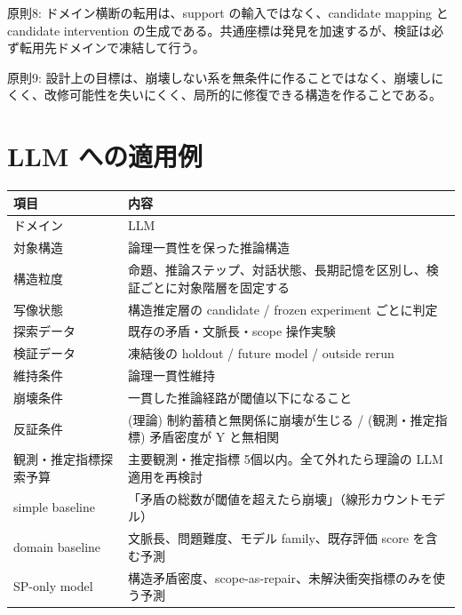 \documentclass[12pt,a4paper]{article}
\begin{document}
原則8: ドメイン横断の転用は、support の輸入ではなく、candidate mapping と candidate intervention の生成である。共通座標は発見を加速するが、検証は必ず転用先ドメインで凍結して行う。

原則9: 設計上の目標は、崩壊しない系を無条件に作ることではなく、崩壊しにくく、改修可能性を失いにくく、局所的に修復できる構造を作ることである。

\section{LLM への適用例}\label{llm-ux3078ux306eux9069ux7528ux4f8b}

{\def\LTcaptype{table} %
\begin{longtable}[]{@{}
  >{\raggedright\arraybackslash}p{}
  >{\raggedright\arraybackslash}p{}@{}}
\toprule\noalign{}
\begin{minipage}[b]{\linewidth}\raggedright
項目
\end{minipage} & \begin{minipage}[b]{\linewidth}\raggedright
内容
\end{minipage} \\
\midrule\noalign{}
\endhead
\bottomrule\noalign{}
\endlastfoot
ドメイン & LLM \\
対象構造 & 論理一貫性を保った推論構造 \\
構造粒度 & 命題、推論ステップ、対話状態、長期記憶を区別し、検証ごとに対象階層を固定する \\
写像状態 & 構造推定層の candidate / frozen experiment ごとに判定 \\
探索データ & 既存の矛盾・文脈長・scope 操作実験 \\
検証データ & 凍結後の holdout / future model / outside rerun \\
維持条件 & 論理一貫性維持 \\
崩壊条件 & 一貫した推論経路が閾値以下になること \\
反証条件 & (理論) 制約蓄積と無関係に崩壊が生じる / (観測・推定指標) 矛盾密度が Y と無相関 \\
観測・推定指標探索予算 & 主要観測・推定指標 5個以内。全て外れたら理論の LLM 適用を再検討 \\
simple baseline & 「矛盾の総数が閾値を超えたら崩壊」（線形カウントモデル） \\
domain baseline & 文脈長、問題難度、モデル family、既存評価 score を含む予測 \\
SP-only model & 構造矛盾密度、scope-as-repair、未解決衝突指標のみを使う予測 \\

\end{longtable}}
\end{document}
